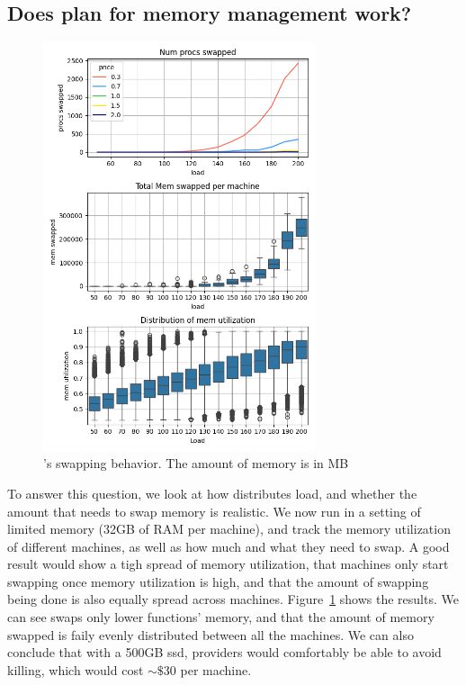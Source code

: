 \subsection{Does \sys{} plan for memory management work?}

\begin{figure}[t!]
    \centering
      \includegraphics[width=8cm]{img/memory_graphs.png}
      \caption{ \sys{}'s swapping behavior. The amount of memory is in MB  }
    \label{fig:memory-graphs}
\end{figure}

To answer this question, we look at how \sys{} distributes load, and whether the
amount that \sys{} needs to swap memory is realistic. We now run \sys{} in a
setting of limited memory (32GB of RAM per machine), and track the memory
utilization of different machines, as well as how much and what they need to
swap. A good result would show a tigh spread of memory utilization, that
machines only start swapping once memory utilization is high, and that the
amount of swapping being done is also equally spread across machines.
Figure~\ref{fig:memory-graphs} shows the results. We can see \sys{} swaps only
lower \class{} functions' memory, and that the amount of memory swapped is faily
evenly distributed between all the machines. We can also conclude that with a
500GB ssd, providers would comfortably be able to avoid killing, which would
cost $\sim\$$30 per machine.


